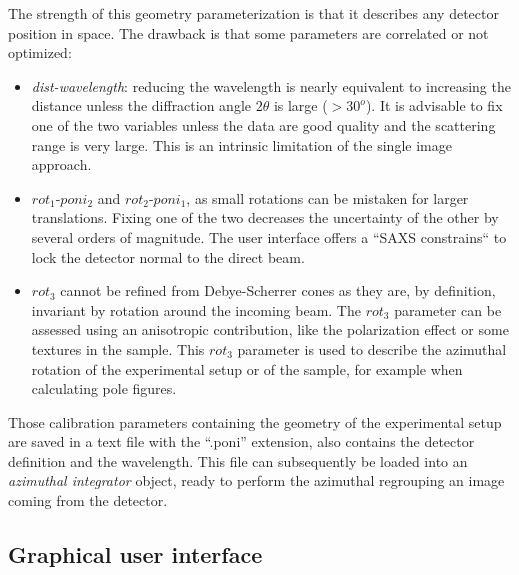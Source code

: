 \documentclass[preprint]{iucr}              %
\begin{document}


The strength of this geometry parameterization is that it describes any detector position in
space. 
The drawback is that some parameters are correlated or not optimized:

\begin{itemize}
  \item \textit{dist-wavelength}: reducing the wavelength is nearly equivalent
  to increasing the distance unless the diffraction angle $2\theta$ is 
  large ($>30^o$). 
  It is advisable to fix one of the two variables unless the data are good
  quality and the scattering range is very large. 
  This is an intrinsic limitation of the single image approach.
  \item $rot_1$-$poni_2$ and $rot_2$-$poni_1$, as small rotations can be
  mistaken for larger translations. 
  Fixing one of the two decreases the uncertainty of the other by several orders of
  magnitude. 
  The user interface offers a ``SAXS constrains`` to lock the detector normal to the direct beam.
  \item $rot_3$ cannot be refined from Debye-Scherrer cones as they are, by definition,
  invariant by rotation around the incoming beam. 
  The $rot_3$ parameter can be
  assessed using an anisotropic contribution, like the polarization effect or
  some  textures in the sample.
  This $rot_3$ parameter is used to describe the azimuthal rotation of
  the experimental setup or of the sample, for example when calculating pole
  figures.
\end{itemize}
 
Those calibration parameters containing the geometry of the experimental setup 
are saved in a text file with the ``.poni'' extension, 
also contains the detector definition and the wavelength.
This file can subsequently be loaded into an \textit{azimuthal integrator}
object, ready to perform the azimuthal regrouping an image coming from the detector.

\subsection{Graphical user interface}
\end{document}
